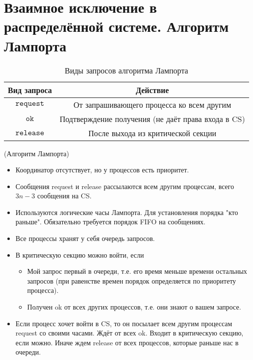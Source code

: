 \section{Взаимное исключение в распределённой системе. Алгоритм Лампорта}

\begin{table}[!ht]
    \centering
    \begin{tabular}{|c|c|} \hline
        Вид запроса & Действие \\ \hline
        $\texttt{request}$ & От запрашивающего процесса ко всем другим\\ \hline
        $\texttt{ok}$ & Подтверждение получения (не даёт права входа в CS) \\ \hline
        $\texttt{release}$ & После выхода из критической секции \\\hline
    \end{tabular}
    \caption{Виды запросов алгоритма Лампорта}
\end{table}

\begin{algorithm}(Алгоритм Лампорта)
\begin{itemize}
    \item Координатор отсутствует, но у процессов есть приоритет.
    \item Сообщения request и release рассылаются всем другим процессам, всего $3n-3$ сообщения на CS.
    \item Используются логические часы Лампорта.
        Для установления порядка "кто раньше".
        Обязательно требуется порядок FIFO на сообщениях.
    \item Все процессы хранят у себя очередь запросов.
    \item В критическую секцию можно войти, если
        \begin{itemize}
            \item Мой запрос первый в очереди, т.е. его время меньше времени 
                остальных запросов (при равенстве времен порядок определяется 
                по приоритету процесса).
            \item Получен ok от всех других процессов, т.е. они знают о вашем запросе.
        \end{itemize}
    \item Если процесс хочет войти в CS, то он посылает всем другим процессам request со
        своими часами. Ждёт от всех ok. Входит в критическую секцию, если можно.
        Иначе ждем release от всех процессов, которые раньше нас в очереди.
\end{itemize}
\end{algorithm}

